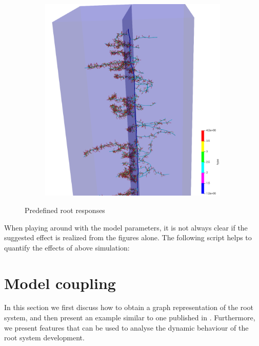 \documentclass[a4paper]{article}
\begin{document}
\begin{figure}
\begin{subfigure}[c]{0.3\textwidth}
 \label{fig:insertion}
\end{subfigure}
\begin{subfigure}[c]{0.3\textwidth}
\includegraphics[width=0.99\textwidth]{example4b3.png}
 \label{fig:probability}
\end{subfigure}
\caption{Predefined root responses}
\end{figure}


When playing around with the model parameters, it is not always clear if the suggested effect is realized from the figures alone. 
The following script helps to quantify the effects of above simulation: 






\section{Model coupling}

In this section we first discuss how to obtain a graph representation of the root system, and then present an example similar to one published in \cite{}. 
Furthermore, we present features that can be used to analyse the dynamic behaviour of the root system development.
\end{document}
